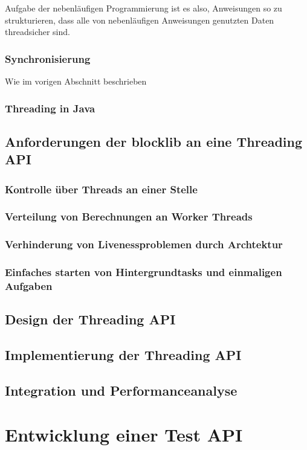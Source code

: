\documentclass[12pt,a4paper,listof=totocnumbered,parskip=half]{scrreprt}
\begin{document}
Aufgabe der nebenläufigen Programmierung ist es also, Anweisungen so zu strukturieren, dass alle von nebenläufigen Anweisungen genutzten Daten threadsicher sind.

\subsection{Synchronisierung}
Wie im vorigen Abschnitt beschrieben 

\subsection{Threading in Java}
\section{Anforderungen der blocklib an eine Threading API}
\subsection{Kontrolle über Threads an einer Stelle}
\subsection{Verteilung von Berechnungen an Worker Threads}
\subsection{Verhinderung von Livenessproblemen durch Archtektur}
\subsection{Einfaches starten von Hintergrundtasks und einmaligen Aufgaben}
\section{Design der Threading API}
\section{Implementierung der Threading API}
\section{Integration und Performanceanalyse}

\chapter{Entwicklung einer Test API}
\end{document}
